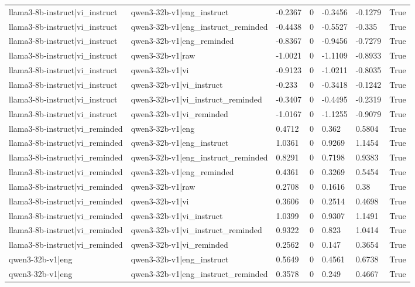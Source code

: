 \begin{table}
\begin{tabular}{llllllr}
llama3-8b-instruct|vi_instruct & qwen3-32b-v1|eng_instruct & -0.2367 & 0 & -0.3456 & -0.1279 & True \\
llama3-8b-instruct|vi_instruct & qwen3-32b-v1|eng_instruct_reminded & -0.4438 & 0 & -0.5527 & -0.335 & True \\
llama3-8b-instruct|vi_instruct & qwen3-32b-v1|eng_reminded & -0.8367 & 0 & -0.9456 & -0.7279 & True \\
llama3-8b-instruct|vi_instruct & qwen3-32b-v1|raw & -1.0021 & 0 & -1.1109 & -0.8933 & True \\
llama3-8b-instruct|vi_instruct & qwen3-32b-v1|vi & -0.9123 & 0 & -1.0211 & -0.8035 & True \\
llama3-8b-instruct|vi_instruct & qwen3-32b-v1|vi_instruct & -0.233 & 0 & -0.3418 & -0.1242 & True \\
llama3-8b-instruct|vi_instruct & qwen3-32b-v1|vi_instruct_reminded & -0.3407 & 0 & -0.4495 & -0.2319 & True \\
llama3-8b-instruct|vi_instruct & qwen3-32b-v1|vi_reminded & -1.0167 & 0 & -1.1255 & -0.9079 & True \\
llama3-8b-instruct|vi_reminded & qwen3-32b-v1|eng & 0.4712 & 0 & 0.362 & 0.5804 & True \\
llama3-8b-instruct|vi_reminded & qwen3-32b-v1|eng_instruct & 1.0361 & 0 & 0.9269 & 1.1454 & True \\
llama3-8b-instruct|vi_reminded & qwen3-32b-v1|eng_instruct_reminded & 0.8291 & 0 & 0.7198 & 0.9383 & True \\
llama3-8b-instruct|vi_reminded & qwen3-32b-v1|eng_reminded & 0.4361 & 0 & 0.3269 & 0.5454 & True \\
llama3-8b-instruct|vi_reminded & qwen3-32b-v1|raw & 0.2708 & 0 & 0.1616 & 0.38 & True \\
llama3-8b-instruct|vi_reminded & qwen3-32b-v1|vi & 0.3606 & 0 & 0.2514 & 0.4698 & True \\
llama3-8b-instruct|vi_reminded & qwen3-32b-v1|vi_instruct & 1.0399 & 0 & 0.9307 & 1.1491 & True \\
llama3-8b-instruct|vi_reminded & qwen3-32b-v1|vi_instruct_reminded & 0.9322 & 0 & 0.823 & 1.0414 & True \\
llama3-8b-instruct|vi_reminded & qwen3-32b-v1|vi_reminded & 0.2562 & 0 & 0.147 & 0.3654 & True \\
qwen3-32b-v1|eng & qwen3-32b-v1|eng_instruct & 0.5649 & 0 & 0.4561 & 0.6738 & True \\
qwen3-32b-v1|eng & qwen3-32b-v1|eng_instruct_reminded & 0.3578 & 0 & 0.249 & 0.4667 & True \\

\end{tabular}
\end{table}
